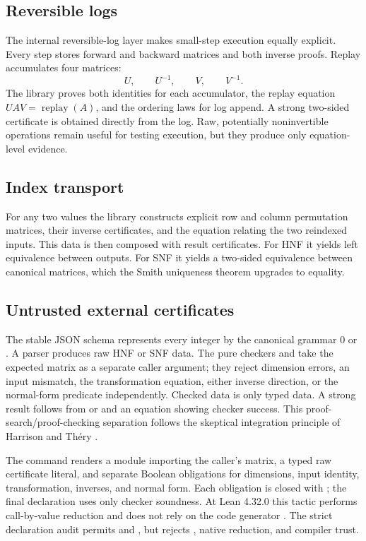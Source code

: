 \subsection{Reversible logs}

The internal reversible-log layer makes small-step execution equally explicit.
Every step stores forward and backward matrices and both inverse proofs. Replay
accumulates four matrices:
\[
  U,\qquad U^{-1},\qquad V,\qquad V^{-1}.
\]
The library proves both identities for each accumulator, the replay equation
\(UAV=\operatorname{replay}(A)\), and the ordering laws for log append. A
strong two-sided certificate is obtained directly from the log. Raw,
potentially noninvertible operations remain useful for testing execution, but
they produce only equation-level evidence.

\subsection{Index transport}

For any two  values the library constructs explicit row
and column permutation matrices, their inverse certificates, and the equation
relating the two reindexed inputs. This data is then composed with result
certificates. For HNF it yields left equivalence between outputs. For SNF it
yields a two-sided equivalence between canonical  matrices, which
the Smith uniqueness theorem upgrades to equality.

\subsection{Untrusted external certificates}

The stable JSON schema  represents every integer by
the canonical grammar \(0\) or . A parser produces raw HNF
or SNF data. The pure checkers  and  take the
expected matrix as a separate caller argument; they reject dimension errors,
an input mismatch, the transformation equation, either inverse direction, or
the normal-form predicate independently. Checked data is only typed data. A
strong result follows from  or
 and an equation showing checker success.
This proof-search/proof-checking separation follows the skeptical integration
principle of Harrison and Th\'ery \citep{harrisonThery1998}.

The  command renders a module importing the
caller's matrix, a typed raw certificate literal, and separate Boolean
obligations for dimensions, input identity, transformation, inverses, and
normal form. Each obligation is closed with ; the final
declaration uses only checker soundness. At Lean 4.32.0 this tactic performs
call-by-value reduction and does not rely on the code generator
\citep{lean4320decideCbv}. The strict declaration audit permits
 and , but rejects
, native reduction, and compiler trust.

